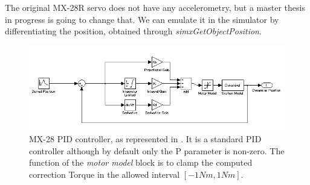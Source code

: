 The original MX-28R servo does not have any accelerometry, but a master thesis in progress is going to change that. We can emulate it in the simulator by differentiating the position, obtained through \emph{simxGetObjectPosition}. 

\begin{figure}[htp]
\center
    \includegraphics[width = \textwidth]{figures/pidcontrol}
    \caption[MX-28 PID controller]{MX-28 PID controller, as represented in \cite{mx_28_manual}. It is a standard PID controller although by default only the P parameter is non-zero. The function of the \textit{motor model} block is to clamp the computed correction Torque in the allowed interval $[-1Nm, 1Nm]$. }
    \label{fig:mx28_pid}
\end{figure}